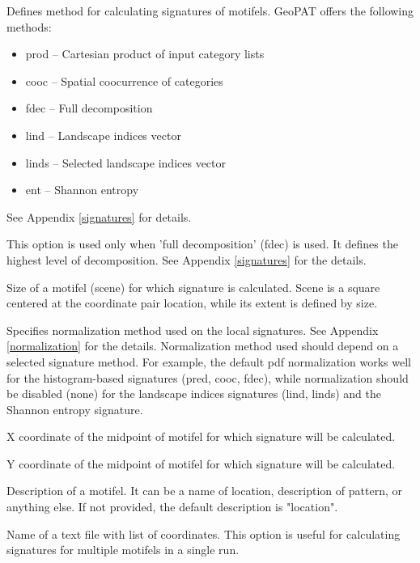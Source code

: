 
Defines method for calculating signatures of motifels.
GeoPAT offers the following methods: 
\begin{itemize}
	\item prod -- Cartesian product of input category lists
	\item cooc -- Spatial coocurrence of categories
	\item fdec -- Full decomposition
	\item lind -- Landscape indices vector
	\item linds -- Selected landscape indices vector
	\item ent -- Shannon entropy
\end{itemize}
See Appendix \ref{signatures} for details.


This option is used only when 'full decomposition' (fdec) is used.
It defines the highest level of decomposition.
See Appendix \ref{signatures} for the details.


Size of a motifel (scene) for which signature is calculated.
Scene is a square centered at the coordinate pair location, while its extent is defined by size. 


Specifies normalization method used on the local signatures. 
See Appendix \ref{normalization} for the details.
Normalization method used should depend on a selected signature method. 
For example, the default pdf normalization works well for the histogram-based signatures (pred, cooc, fdec), while normalization should be disabled (none) for the landscape indices signatures (lind, linds) and the Shannon entropy signature.


X coordinate of the midpoint of motifel for which signature will be calculated.


Y coordinate of the midpoint of motifel for which signature will be calculated.


Description of a motifel.
It can be a name of location, description of pattern, or anything else. 
If not provided, the default description is "location".


Name of a text file with list of coordinates. 
This option is useful for calculating signatures for multiple motifels in a single run. 

